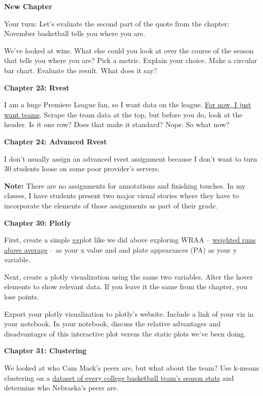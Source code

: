 \documentclass[]{book}
\begin{document}
\textbf{New Chapter}

Your turn: Let's evaluate the second part of the quote from the chapter: November basketball tells you where you are.

We've looked at wins. What else could you look at over the course of the season that tells you where you are? Pick a metric. Explain your choice. Make a circular bar chart. Evaluate the result. What does it say?

\textbf{Chapter 23: Rvest}

I am a huge Premiere League fan, so I want data on the league. \href{https://fbref.com/en/comps/9/stats/Premier-League-Stats}{For now, I just want teams}. Scrape the team data at the top, but before you do, look at the header. Is it one row? Does that make it standard? Nope. So what now?

\textbf{Chapter 24: Advanced Rvest}

I don't usually assign an advanced rvest assignment because I don't want to turn 30 students loose on some poor provider's servers.

\textbf{Note:} There are no assignments for annotations and finishing touches. In my classes, I have students present two major visual stories where they have to incorporate the elements of those assignments as part of their grade.

\textbf{Chapter 30: Plotly}

First, create a simple ggplot like we did above exploring WRAA -- \href{http://m.mlb.com/glossary/advanced-stats/weighted-runs-above-average}{weighted runs above average} -- as your x value and and plate appearances (PA) as your y variable.

Next, create a plotly visualization using the same two variables. Alter the hover elements to show relevant data. If you leave it the same from the chapter, you lose points.

Export your plotly visualization to plotly's website. Include a link of your viz in your notebook. In your notebook, discuss the relative advantages and disadvantages of this interactive plot versus the static plots we've been doing.

\textbf{Chapter 31: Clustering}

We looked at who Cam Mack's peers are, but what about the team? Use k-means clustering on a \href{https://unl.box.com/s/qdqu5rbz7f9jtk04fhuiqrb9p0nx5a0z}{dataset of every college basketball team's season stats} and determine who Nebraska's peers are.
\end{document}
